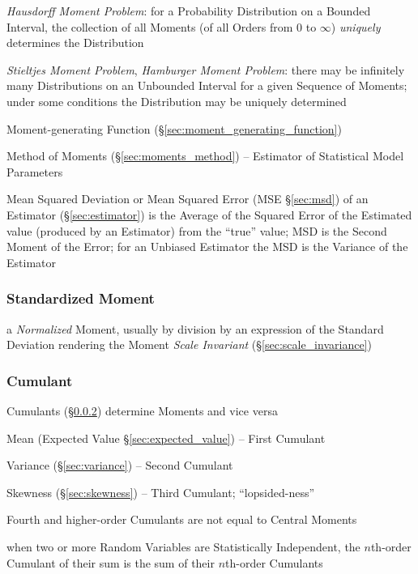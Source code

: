 \emph{Hausdorff Moment Problem}: for a Probability Distribution on a Bounded
Interval, the collection of all Moments (of all Orders from $0$ to $\infty$)
\emph{uniquely} determines the Distribution

\emph{Stieltjes Moment Problem}, \emph{Hamburger Moment Problem}: there may be
infinitely many Distributions on an Unbounded Interval for a given Sequence of
Moments; under some conditions the Distribution may be uniquely determined

\fist Moment-generating Function (\S\ref{sec:moment_generating_function})

\fist Method of Moments (\S\ref{sec:moments_method}) -- Estimator of Statistical
Model Parameters

\fist Mean Squared Deviation or Mean Squared Error (MSE \S\ref{sec:msd}) of an
Estimator (\S\ref{sec:estimator}) is the Average of the Squared Error of the
Estimated value (produced by an Estimator) from the ``true'' value; MSD is
the Second Moment of the Error; for an Unbiased Estimator the MSD is the
Variance of the Estimator



\subsubsection{Standardized Moment}\label{sec:standardized_moment}

a \emph{Normalized} Moment, usually by division by an expression of the Standard
Deviation rendering the Moment \emph{Scale Invariant}
(\S\ref{sec:scale_invariance})



\subsubsection{Cumulant}\label{sec:cumulant}

Cumulants (\S\ref{sec:cumulant}) determine Moments and vice versa

Mean (Expected Value \S\ref{sec:expected_value}) -- First Cumulant

Variance (\S\ref{sec:variance}) -- Second Cumulant

Skewness (\S\ref{sec:skewness}) -- Third Cumulant; ``lopsided-ness''

Fourth and higher-order Cumulants are not equal to Central Moments

when two or more Random Variables are Statistically Independent, the $n$th-order
Cumulant of their sum is the sum of their $n$th-order Cumulants

